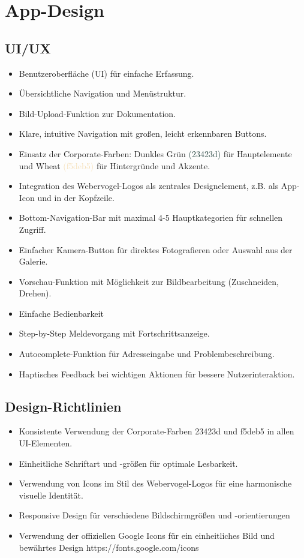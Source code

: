 \section{App-Design}
\subsection{UI/UX}
\begin{itemize}
    \item Benutzeroberfläche (UI) für einfache Erfassung.
    \item Übersichtliche Navigation und Menüstruktur.
    \item Bild-Upload-Funktion zur Dokumentation.
    \item Klare, intuitive Navigation mit großen, leicht erkennbaren Buttons.
    \item Einsatz der Corporate-Farben: Dunkles Grün \textcolor[HTML]{23423d}{(23423d)} für Hauptelemente und Wheat \textcolor[HTML]{f5deb5}{(f5deb5)} für Hintergründe und Akzente.
    \item Integration des Webervogel-Logos als zentrales Designelement, z.B. als App-Icon und in der Kopfzeile.
    \item Bottom-Navigation-Bar mit maximal 4-5 Hauptkategorien für schnellen Zugriff.
    \item Einfacher Kamera-Button für direktes Fotografieren oder Auswahl aus der Galerie.
    \item Vorschau-Funktion mit Möglichkeit zur Bildbearbeitung (Zuschneiden, Drehen).
    \item Einfache Bedienbarkeit
    \item Step-by-Step Meldevorgang mit Fortschrittsanzeige.
    \item Autocomplete-Funktion für Adresseingabe und Problembeschreibung.
    \item Haptisches Feedback bei wichtigen Aktionen für bessere Nutzerinteraktion.
\end{itemize}

\subsection{Design-Richtlinien}

\begin{itemize}
    \item Konsistente Verwendung der Corporate-Farben 23423d und f5deb5 in allen UI-Elementen.
    \item Einheitliche Schriftart und -größen für optimale Lesbarkeit.
    \item Verwendung von Icons im Stil des Webervogel-Logos für eine harmonische visuelle Identität.
    \item Responsive Design für verschiedene Bildschirmgrößen und -orientierungen
\item Verwendung der offiziellen Google Icons für ein einheitliches Bild und bewährtes Design https://fonts.google.com/icons
\end{itemize}